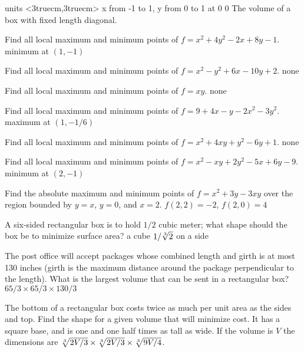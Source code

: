 \figure
\texonly
\vbox{\beginpicture
\normalgraphs
\ninepoint
\setcoordinatesystem units <3truecm,3truecm>
\setplotarea x from -1 to 1, y from 0 to 1
 at 0 0
\endpicture}
\endtexonly
{}
\begincaption
The volume of a box with fixed length diagonal.
\endcaption
\endfigure

\exercises

\exercise Find all local maximum and minimum points of
$f=x^2+4y^2-2x+8y-1$.
\answer minimum at $(1,-1)$
\endanswer
\endexercise

\exercise Find all local maximum and minimum points of
$f=x^2-y^2+6x-10y+2$.
\answer none
\endanswer
\endexercise

\exercise Find all local maximum and minimum points of
$f=xy$.
\answer none
\endanswer
\endexercise

\exercise Find all local maximum and minimum points of
$f=9+4x-y-2x^2-3y^2$.
\answer maximum at $(1,-1/6)$
\endanswer
\endexercise

\exercise Find all local maximum and minimum points of
$f=x^2+4xy+y^2-6y+1$.
\answer none
\endanswer
\endexercise

\exercise Find all local maximum and minimum points of
$f=x^2-xy+2y^2-5x+6y-9$.
\answer minimum at $(2,-1)$
\endanswer

\endexercise

\exercise Find the absolute maximum and minimum points of
$f=x^2+3y-3xy$ over the region bounded by
$y=x$, $y=0$, and $x=2$.
\answer $f(2,2)=-2$, $f(2,0)=4$
\endanswer
\endexercise

\exercise A six-sided rectangular box is to hold $1/2$ cubic meter;
what shape should the box be to minimize surface area?
\answer a cube $1/\root 3 \of {2}$ on a side
\endanswer
\endexercise

\exercise The post office will accept packages whose combined length
and girth is at most 130 inches (girth is the maximum distance around
the package perpendicular to the length). What is the largest volume
that can be sent in a rectangular box?
\answer $65/3\times 65/3\times 130/3$
\endanswer
\endexercise

\exercise The bottom of a rectangular box costs twice as much per unit
area as the sides and top. Find the shape for a given volume that will
minimize cost.
\answer It has a square base, and is one and one half times as tall as wide.
If the volume is $V$ the dimensions are $\root 3 \of {2V/3}\times
\root 3 \of {2V/3}\times \root 3\of {9V/4}$.
\endanswer
\endexercise


